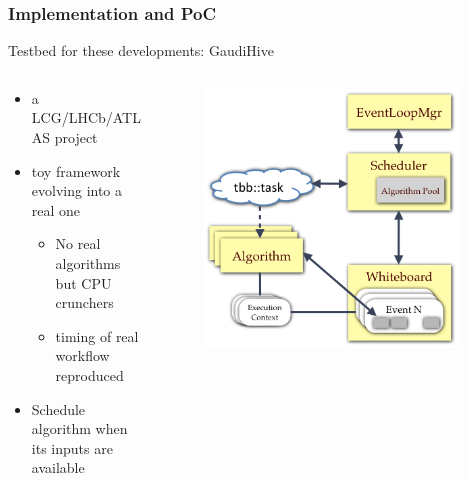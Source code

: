 \documentclass[9pt]{beamer}
\begin{document}
\begin{frame}
\frametitle{Implementation and PoC}


Testbed for these developments: \alert{GaudiHive}

  \begin{columns}
    \begin{column}{0.7\textwidth}

      \begin{block}{}
        \begin{itemize}
          \item a LCG/LHCb/ATLAS project
          \item toy framework evolving into a real one
          \begin{itemize}
            \item No real algorithms but CPU crunchers
            \item timing of real workflow reproduced
          \end{itemize}
          \item Schedule algorithm when its inputs are available
        \end{itemize}
      \end{block}

    \end{column}
    \begin{column}{0.35\textwidth}
\begin{figure}
  \begin{center}
    \includegraphics[width=0.95\textwidth]{figs/gaudi-hive.png}
  \end{center}
\end{figure}
    \end{column}
  \end{columns}
\end{frame}
\end{document}
